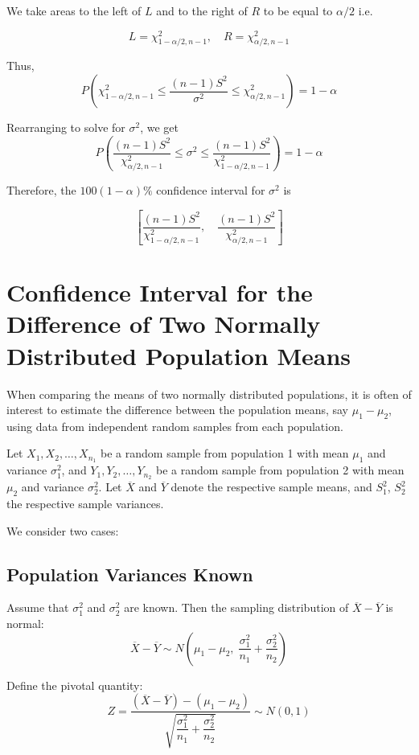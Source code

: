 \documentclass[twoside]{book}
\begin{document}
We take areas to the left of $L$ and to the right of $R$ to be equal to $\alpha/2$ i.e.

$$L = \chi_{1-\alpha/2, n-1}^2, \quad R = \chi_{\alpha/2, n-1}^2$$

Thus,
\[
P\left(\chi^2_{1-\alpha/2, n-1} \leq \frac{(n-1) S^2}{\sigma^2} \leq \chi^2_{\alpha/2, n-1}\right) = 1 - \alpha
\]

Rearranging to solve for $\sigma^2$, we get
\[
P\left(\frac{(n-1) S^2}{\chi^2_{\alpha/2, n-1}} \leq \sigma^2 \leq \frac{(n-1) S^2}{\chi^2_{1-\alpha/2, n-1}}\right) = 1 - \alpha
\]

Therefore, the $100(1-\alpha)\%$ confidence interval for $\sigma^2$ is
\begin{textbox}
\[
\left[\frac{(n-1) S^2}{\chi^2_{1-\alpha/2, n-1}}, \quad \frac{(n-1) S^2}{\chi^2_{\alpha/2, n-1}} \right]
\]
\end{textbox}

\section{Confidence Interval for the Difference of Two Normally Distributed Population Means}

When comparing the means of two normally distributed populations, it is often of interest to estimate the difference between the population means, say \(\mu_1 - \mu_2\), using data from independent random samples from each population.

Let \(X_1, X_2, \dots, X_{n_1}\) be a random sample from population 1 with mean \(\mu_1\) and variance \(\sigma_1^2\), and \(Y_1, Y_2, \dots, Y_{n_2}\) be a random sample from population 2 with mean \(\mu_2\) and variance \(\sigma_2^2\). Let \(\overline{X}\) and \(\overline{Y}\) denote the respective sample means, and \(S_1^2\), \(S_2^2\) the respective sample variances.

We consider two cases:

\subsection{Population Variances Known}

Assume that \(\sigma_1^2\) and \(\sigma_2^2\) are known. Then the sampling distribution of \(\overline{X} - \overline{Y}\) is normal:
\[
\overline{X} - \overline{Y} \sim N\left(\mu_1 - \mu_2,\; \frac{\sigma_1^2}{n_1} + \frac{\sigma_2^2}{n_2} \right)
\]

Define the pivotal quantity:
\[
Z = \dfrac{(\overline{X} - \overline{Y}) - (\mu_1 - \mu_2)}{\sqrt{\dfrac{\sigma_1^2}{n_1} + \dfrac{\sigma_2^2}{n_2}}} \sim N(0,1)
\]
\end{document}
